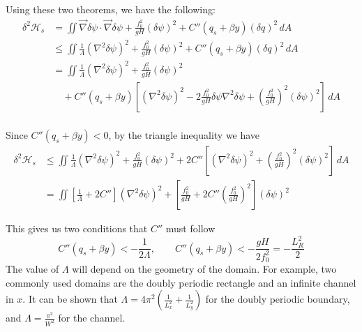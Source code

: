 \documentclass[12pt]{article}
\begin{document}
{{{            Using these two theorems, we have the following:
            \begin{align*}
                \delta^2\mathcal{H}_s
                &= \iint \vec\nabla \delta \psi \cdot \vec \nabla \delta \psi + \frac{f_0^2}{gH} (\delta \psi)^2+  C''(q_s + \beta y) (\delta q)^2  \, dA \\
                &\le \iint \frac{1}{\Lambda}(\nabla^2\delta\psi)^2 + \frac{f_0^2}{gH} (\delta \psi)^2+  C''(q_s + \beta y) (\delta q)^2  \, dA \\
                &= \iint \frac{1}{\Lambda}(\nabla^2\delta\psi)^2 + \frac{f_0^2}{gH} (\delta \psi)^2 \\
                &\quad+  C''(q_s + \beta y) \left[ (\nabla^2 \delta\psi)^2 - 2\frac{f_0^2}{gH}\delta\psi\nabla^2\delta\psi + \left( \frac{f_0^2}{gH} \right)^2 (\delta\psi)^2 \right]  \, dA \\
            \end{align*}
            
            Since $C''(q_s + \beta y) < 0$, by the triangle inequality we have
            \begin{align*}
                \delta^2\mathcal{H}_s
                &\le \iint \frac{1}{\Lambda}(\nabla^2\delta\psi)^2 + \frac{f_0^2}{gH} (\delta \psi)^2 +  2C'' \left[ (\nabla^2 \delta\psi)^2 + \left( \frac{f_0^2}{gH} \right)^2 (\delta\psi)^2 \right]  \, dA \\
                &= \iint \left[ \frac1\Lambda + 2C''\right](\nabla^2\delta\psi)^2 + \left[ \frac{f_0^2}{gH} + 2C''\left(\frac{f_0^2}{gH}\right)^2\right](\delta\psi)^2    
            \end{align*}
            
            
            This gives us two conditions that $C''$ must follow
            $$
                C''(q_s + \beta y) < -\frac{1}{2\Lambda}, \quad\quad C''(q_s + \beta y) < -\frac{gH}{2f_0^2}=-\frac{L_R^2}{2}
            $$
            The value of $\Lambda$ will depend on the geometry of the domain. For example, two commonly used domains are the doubly periodic rectangle and an infinite channel in $x$.
            It can be shown that $\Lambda = 4\pi^2(\frac1{L_x^2} + \frac1{L_y^2})$ for the doubly periodic boundary, and $\Lambda = \frac{\pi^2}{W^2}$ for the channel.
        }
    }

}
\end{document}
